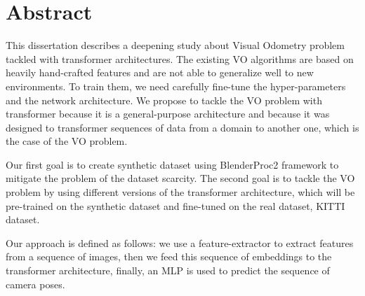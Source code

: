 
\cleardoublepage
{}
{}
\begingroup
\let\clearpage\relax
\let\cleardoublepage\relax
\let\cleardoublepage\relax

\chapter*{Abstract}

%
%
This dissertation describes a deepening study about Visual Odometry problem tackled with transformer architectures.
The existing VO algorithms are based on heavily hand-crafted features and are not able to generalize well to new environments.
To train them, we need carefully fine-tune the hyper-parameters and the network architecture.
We propose to tackle the VO problem with transformer because it is a general-purpose architecture and because it was designed to transformer sequences of data from a domain to another one, which is the case of the VO problem.

Our first goal is to create synthetic dataset using BlenderProc2 framework to mitigate the problem of the dataset scarcity.
The second goal is to tackle the VO problem by using different versions of the transformer architecture, which will be pre-trained on the synthetic dataset and fine-tuned on the real dataset, KITTI dataset.

Our approach is defined as follows: we use a feature-extractor to extract features from a sequence of images, then we feed this sequence of embeddings to the transformer architecture, finally, an MLP is used to predict the sequence of camera poses.
\endgroup

\vfill


